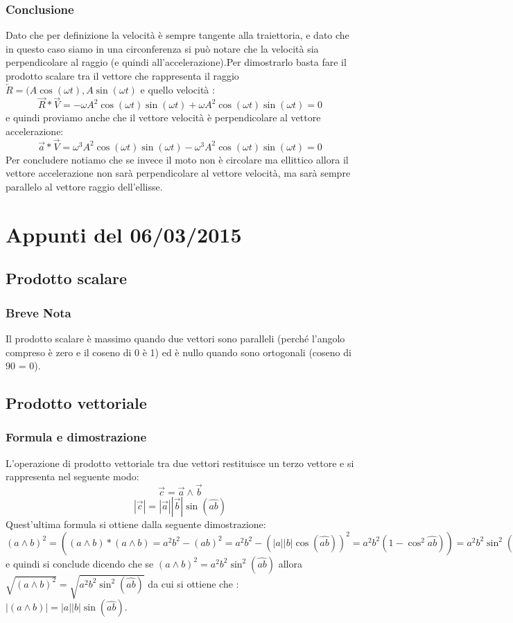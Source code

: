 \documentclass[fontsize = 20px, paper = a4]{article}
\begin{document}
\subsubsection{Conclusione}
Dato che per definizione la velocità è sempre tangente alla traiettoria, e dato che in questo caso siamo in una circonferenza si può notare che la velocità sia perpendicolare al raggio (e quindi all'accelerazione).Per dimostrarlo basta fare il prodotto scalare tra il vettore che rappresenta il raggio $\overleftarrow{R} = (A\cos(\omega t),A\sin(\omega t)$ e quello velocità : 
$$\overrightarrow{R} * \overrightarrow{V} = -\omega A^2 \cos(\omega t) \sin(\omega t) +\omega A^2 \cos(\omega t) \sin(\omega t) = 0 $$
e quindi proviamo anche che il vettore velocità è perpendicolare al vettore accelerazione:
$$\overrightarrow{a} * \overrightarrow{V} = \omega^3A^2\cos(\omega t) \sin(\omega t) -\omega^3A^2\cos(\omega t) \sin(\omega t) = 0$$
Per concludere notiamo che se invece il moto non è circolare ma ellittico allora il vettore accelerazione non sarà perpendicolare al vettore velocità, ma sarà sempre parallelo al vettore raggio dell'ellisse.
\section{Appunti del 06/03/2015}
\subsection{Prodotto scalare}
\subsubsection{Breve Nota}
Il prodotto scalare è massimo quando due vettori sono paralleli (perché l'angolo compreso è zero e il coseno di 0 è 1) ed è nullo quando sono ortogonali (coseno di 90 = 0).
\subsection{Prodotto vettoriale}
\subsubsection{Formula e dimostrazione}
L'operazione di prodotto vettoriale tra due vettori restituisce un terzo vettore e si rappresenta nel seguente modo:
$$\overrightarrow{c} = \overrightarrow{a} \wedge \overrightarrow{b}$$
$$|\overrightarrow{c}|=|\overrightarrow{a}||\overrightarrow{b}|\sin(\widehat{ab})$$
Quest'ultima formula si ottiene dalla seguente dimostrazione:$(a \wedge b)^2 = ((a \wedge b)*(a \wedge b) = a^2b^2 - (ab)^2 = a^2b^2 -(|a||b|\cos(\widehat{ab}))^2 = a^2b^2(1-\cos^2\widehat{ab})) = a^2b^2 \sin^2(\widehat{ab})$ e quindi si conclude dicendo che se $(a \wedge b)^2 = a^2b^2 \sin^2(\widehat{ab}) $ allora $\sqrt{(a \wedge b)^2} = \sqrt{a^2b^2 \sin^2(\widehat{ab})} $ da cui si ottiene che : $|(a \wedge b)| = |a||b|\sin(\widehat{ab})$. 
\end{document}
